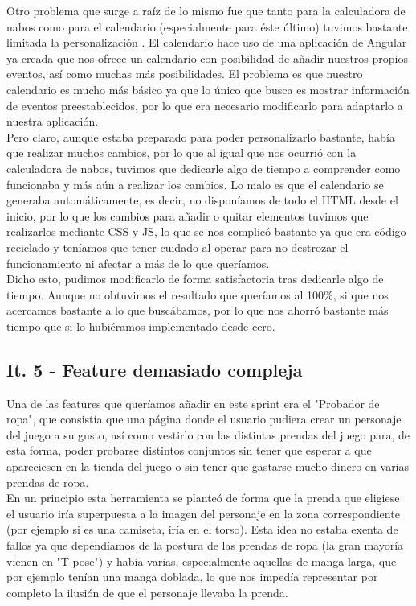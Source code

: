 Otro problema que surge a raíz de lo mismo fue que tanto para la calculadora de nabos como para el calendario (especialmente para éste último) tuvimos bastante limitada la personalización \citep{angularcalendar}. El calendario hace uso de una aplicación de Angular ya creada que nos ofrece un calendario con posibilidad de añadir nuestros propios eventos, así como muchas más posibilidades. El problema es que nuestro calendario es mucho más básico ya que lo único que busca es mostrar información de eventos preestablecidos, por lo que era necesario modificarlo para adaptarlo a nuestra aplicación.\\

Pero claro, aunque estaba preparado para poder personalizarlo bastante, había que realizar muchos cambios, por lo que al igual que nos ocurrió con la calculadora de nabos, tuvimos que dedicarle algo de tiempo a comprender como funcionaba y más aún a realizar los cambios. Lo malo es que el calendario se generaba automáticamente, es decir, no disponíamos de todo el HTML desde el inicio, por lo que los cambios para añadir o quitar elementos tuvimos que realizarlos mediante CSS y JS, lo que se nos complicó bastante ya que era código reciclado y teníamos que tener cuidado al operar para no destrozar el funcionamiento ni afectar a más de lo que queríamos.\\

Dicho esto, pudimos modificarlo de forma satisfactoria tras dedicarle algo de tiempo. Aunque no obtuvimos el resultado que queríamos al 100\%, si que nos acercamos bastante a lo que buscábamos, por lo que nos ahorró bastante más tiempo que si lo hubiéramos implementado desde cero.

\subsection{It. 5 - Feature demasiado compleja}

Una de las features que queríamos añadir en este sprint era el "Probador de ropa", que consistía que una página donde el usuario pudiera crear un personaje del juego a su gusto, así como vestirlo con las distintas prendas del juego para, de esta forma, poder probarse distintos conjuntos sin tener que esperar a que apareciesen en la tienda del juego o sin tener que gastarse mucho dinero en varias prendas de ropa.\\

En un principio esta herramienta se planteó de forma que la prenda que eligiese el usuario iría superpuesta a la imagen del personaje en la zona correspondiente (por ejemplo si es una camiseta, iría en el torso). Esta idea no estaba exenta de fallos ya que dependíamos de la postura de las prendas de ropa (la gran mayoría vienen en "T-pose") y había varias, especialmente aquellas de manga larga, que por ejemplo tenían una manga doblada, lo que nos impedía representar por completo la ilusión de que el personaje llevaba la prenda.\\


